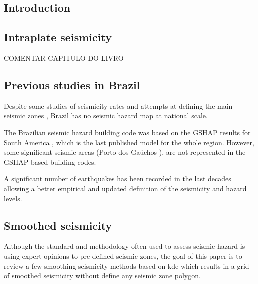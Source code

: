 \documentclass[grl]{agutex}
\begin{document}

\begin{article}

\section{Introduction}

\subsection{Intraplate seismicity}

COMENTAR CAPITULO DO LIVRO

\subsection{Previous studies in Brazil}

Despite some studies of seismicity rates and attempts at defining the main seismic zones \citep{berrocal_1984, berrocal_1996, assumpcao_et_al_2014}, Brazil has no seismic hazard map at national scale.

The Brazilian seismic hazard building code \citep{nbr_15421_2006} was based on the GSHAP \citep{giardini_1999} results for South America \citep{tanner_shepherd_1997, shedlock_tanner_1999}, which is the last published model for the whole region. However, some significant seismic areas (Porto dos Gaúchos \citep{barros_2009}), are not represented in the GSHAP-based building codes.

A significant number of earthquakes has been recorded in the last decades \citep{bsb_2014} allowing a better empirical and updated definition of the seismicity and hazard levels.


\subsection{Smoothed seismicity}

Although the standard \citet{cornell_1968} and \citet{mcguire_1976} methodology often used to assess seismic hazard is using expert opinions to pre-defined seismic zones, the goal of this paper is to review a few smoothing seismicity methods based on \gls{kde} which results in a grid of smoothed seismicity without define any seismic zone polygon.


\end{article}
\end{document}

